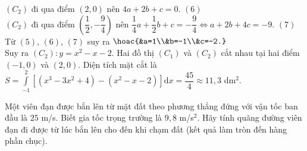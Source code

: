 \begin{bt}
{			$(C_2)$ đi qua điểm $(2,0)$ nên $4a+2b+c=0$. \hfill{$(6)$}\\
			$(C_2)$ đi qua điểm $\left(\dfrac{1}{2},-\dfrac{9}{4}\right)$ nên $\dfrac{1}{4}a+\dfrac{1}{2}b+c=-\dfrac{9}{4} \Leftrightarrow a + 2b +4c = -9$. \hfill{$(7)$}\\
			Từ $(5)$, $(6)$, $(7)$ suy ra $\hoac{&a=1\\&b=-1\\&c=-2.}$\\
			Suy ra $(C_2) \colon y= x^2 - x - 2$.
			Hai đồ thị $(C_1)$ và $(C_2)$ cắt nhau tại hai điểm $(-1,0)$ và $(2,0)$.
			Diện tích mặt cắt là\\
			$S = \displaystyle \int\limits_{-1}^{2} \left[\left(x^3 - 3x^2 +4\right) - \left(x^2 - x - 2\right)\right] \mathrm{d}x = \dfrac{45}{4} \approx 11{,}3$ dm$^2$.
	}
\end{bt}

\begin{bt}%

	Một viên đạn được bắn lên từ mặt đất theo phương thẳng đứng với vận tốc ban đầu là $25$ m/s. Biết gia tốc trọng trường là $9{,}8$ m/s$^2$. Hãy tính quãng đường viên đạn đi được từ lúc bắn lên cho đến khi chạm đất (kết quả làm tròn đến hàng phần chục).
\end{bt}

